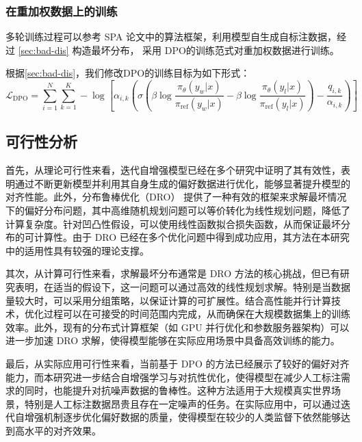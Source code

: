 \subsubsection{在重加权数据上的训练}

多轮训练过程可以参考 SPA\citep{kim2025spread} 论文中的算法框架，利用模型自生成自标注数据，经过 \ref{sec:bad-dis} 构造最坏分布，
采用 DPO\citep{rafailov2023direct}的训练范式对重加权数据进行训练。

根据\ref{sec:bad-dis}，我们修改DPO的训练目标为如下形式：
\begin{equation}
    \mathcal{L}_{\text{DPO}} = \sum_{i=1}^N \sum_{k=1}^K -\log  \left[\alpha_{i,k}\left( \sigma \left( \beta \log \dfrac{\pi_{\theta}(y_w | x)}{\pi_{\text{ref}} (y_w |x)} -  \beta \log \dfrac{\pi_{\theta}(y_l | x)}{\pi_{\text{ref}} (y_l |x)} \right)- \frac{q_{i,k}}{\alpha_{i,k}}\right)\right] 
\end{equation}

\subsection{可行性分析}

首先，从理论可行性来看，迭代自增强模型已经在多个研究中证明了其有效性\citep{Kim2025Spread}，表明通过不断更新模型并利用其自身生成的偏好数据进行优化，能够显著提升模型的对齐性能。此外，分布鲁棒优化（DRO）\citep{Esfahani2018Data} 提供了一种有效的框架来求解最坏情况下的偏好分布问题，其中高维随机规划问题可以等价转化为线性规划问题，降低了计算复杂度。针对凹凸性假设，可以使用线性函数拟合损失函数，从而保证最坏分布的可计算性。由于 DRO 已经在多个优化问题中得到成功应用，其方法在本研究中的适用性具有较强的理论支撑。

其次，从计算可行性来看，求解最坏分布通常是 DRO 方法的核心挑战，但已有研究表明，在适当的假设下，这一问题可以通过高效的线性规划求解\citep{Esfahani2018Data}。特别是当数据量较大时，可以采用分组策略，以保证计算的可扩展性。结合高性能并行计算技术，优化过程可以在可接受的时间范围内完成，从而确保在大规模数据集上的训练效率。此外，现有的分布式计算框架（如 GPU 并行优化和参数服务器架构）可以进一步加速 DRO 求解，使得模型能够在实际应用场景中具备高效训练的能力。

最后，从实际应用可行性来看，当前基于 DPO 的方法已经展示了较好的偏好对齐能力，而本研究进一步结合自增强学习与对抗性优化，使得模型在减少人工标注需求的同时，也能提升对抗噪声数据的鲁棒性。这种方法适用于大规模真实世界场景，特别是人工标注数据昂贵且存在一定噪声的任务。在实际应用中，可以通过迭代自增强机制逐步优化偏好数据的质量，使得模型在较少的人类监督下依然能够达到高水平的对齐效果。

